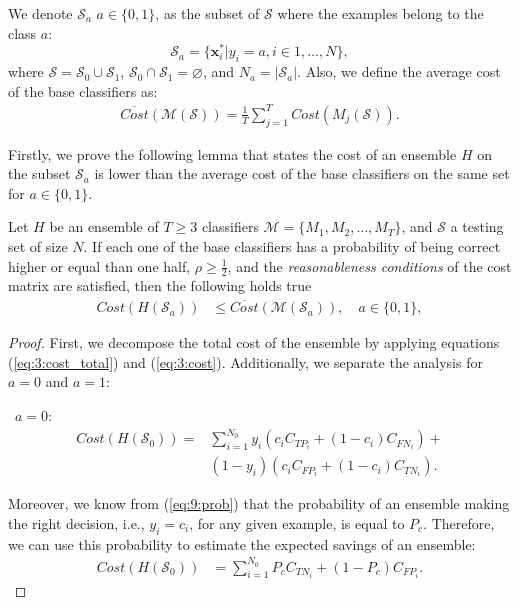 {  We denote $\mathcal{S}_a$ $a\in \{0,1\}$, as the subset of $\mathcal{S}$ 
  where the examples belong to the class $a$:
  \begin{equation}\label{eq:9:S_a}
    \mathcal{S}_a = \{\mathbf{x}_i^* \vert y_i = a, i \in 1,\dots,N\},
  \end{equation}
  where $\mathcal{S}=\mathcal{S}_0 \cup \mathcal{S}_1$, $\mathcal{S}_0 \cap \mathcal{S}_1 = 
  \varnothing$, and $N_a=\vert \mathcal{S}_a \vert$. Also, we define the average cost of the base 
  classifiers as:
  \begin{align}\label{eq:9:avg_cost}
    \overline{Cost} (\mathcal{M}(\mathcal{S}))= \frac{1}{T} \sum_{j=1}^{T} Cost(M_j(\mathcal{S})). 
  \end{align}
  
  \noindent Firstly, we prove the following lemma that states the cost of an ensemble $H$ on the 
  subset $\mathcal{S}_a$ is lower than the average cost of the base classifiers on the same set for 
  $a  \in \{0,1\}$.

  \begin{lemma}\label{lemma1}
  Let $H$ be an ensemble of $T\ge3$ classifiers $\mathcal{M}=\{M_1, M_2,\dots,M_T\}$, and 
  $\mathcal{S}$ a testing set of size $N$. If each one of the base classifiers has a probability 
  of being correct higher or equal than one half, $\rho \ge \frac{1}{2}$, and the 
  \textit{reasonableness conditions} of the cost matrix are satisfied, then the following holds true
  \begin{align}\label{eq:9:lemma}
    Cost(H(\mathcal{S}_a)) &\le \overline{Cost} (\mathcal{M}(\mathcal{S}_a)) , \quad a  \in\{0,1\},  
 \end{align}
  \end{lemma}
  
  \noindent\begin{proof}
  First, we decompose the total cost of the ensemble by applying equations (\ref{eq:3:cost_total}) 
  and (\ref{eq:3:cost}). Additionally, we separate the analysis for $a=0$ and $a=1$:

  \textbullet\ $a=0:$
  \begin{align}
  Cost(H(\mathcal{S}_0)) =& \sum_{i=1}^{N_0} y_i(c_i C_{TP_i} + (1-c_i)C_{FN_i})+ \nonumber \\  
    & (1-y_i)(c_i C_{FP_i} + (1-c_i)C_{TN_i}) . 
  \end{align}
  
  \noindent Moreover, we know from (\ref{eq:9:prob}) that the probability of an ensemble 
  making the right decision, i.e., $y_i=c_i$, for any given  example, is equal to $P_c$. 
  Therefore, we can use this probability to estimate the expected savings of an ensemble: 
  \begin{align}\label{eq:21}
    Cost(H(\mathcal{S}_0)) &= \sum_{i=1}^{N_0} P_c C_{TN_i} +(1-P_c)C_{FP_i}.
  \end{align}
  

\end{proof}}
